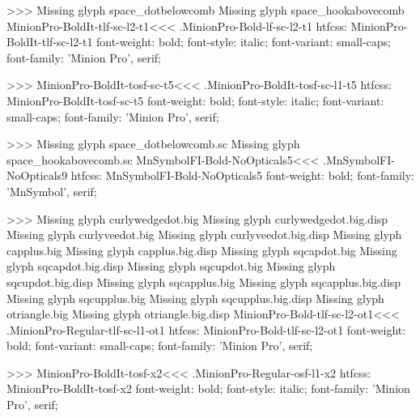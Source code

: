 {>>>
Missing glyph	space_dotbelowcomb
Missing glyph	space_hookabovecomb
\<MinionPro-BoldIt-tlf-sc-l2-t1\><<<
.MinionPro-Bold-lf-sc-l2-t1
htfcss:  MinionPro-BoldIt-tlf-sc-l2-t1  font-weight: bold; font-style: italic; font-variant: small-caps; font-family: 'Minion Pro', serif;

>>>
\<MinionPro-BoldIt-tosf-sc-t5\><<<
.MinionPro-BoldIt-tosf-sc-l1-t5
htfcss:  MinionPro-BoldIt-tosf-sc-t5  font-weight: bold; font-style: italic; font-variant: small-caps; font-family: 'Minion Pro', serif;

>>>
Missing glyph	space_dotbelowcomb.sc
Missing glyph	space_hookabovecomb.sc
\<MnSymbolFI-Bold-NoOpticals5\><<<
.MnSymbolFI-NoOpticals9
htfcss:  MnSymbolFI-Bold-NoOpticals5  font-weight: bold; font-family: 'MnSymbol', serif;

>>>
Missing glyph	curlywedgedot.big
Missing glyph	curlywedgedot.big.disp
Missing glyph	curlyveedot.big
Missing glyph	curlyveedot.big.disp
Missing glyph	capplus.big
Missing glyph	capplus.big.disp
Missing glyph	sqcapdot.big
Missing glyph	sqcapdot.big.disp
Missing glyph	sqcupdot.big
Missing glyph	sqcupdot.big.disp
Missing glyph	sqcapplus.big
Missing glyph	sqcapplus.big.disp
Missing glyph	sqcupplus.big
Missing glyph	sqcupplus.big.disp
Missing glyph	otriangle.big
Missing glyph	otriangle.big.disp
\<MinionPro-Bold-tlf-sc-l2-ot1\><<<
.MinionPro-Regular-tlf-sc-l1-ot1
htfcss:  MinionPro-Bold-tlf-sc-l2-ot1  font-weight: bold; font-variant: small-caps; font-family: 'Minion Pro', serif;

>>>
\<MinionPro-BoldIt-tosf-x2\><<<
.MinionPro-Regular-osf-l1-x2
htfcss:  MinionPro-BoldIt-tosf-x2  font-weight: bold; font-style: italic; font-family: 'Minion Pro', serif;

}
